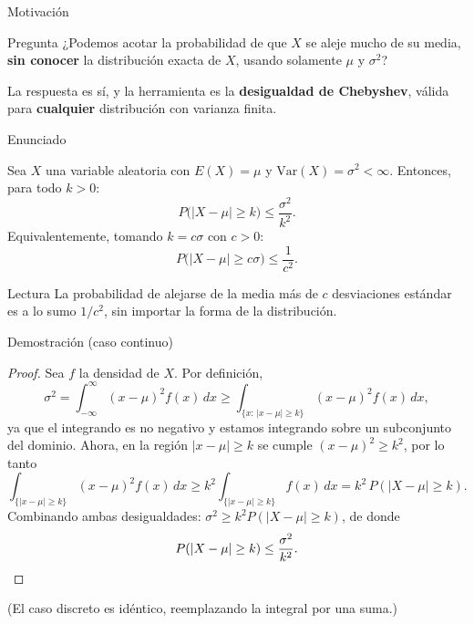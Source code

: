 \documentclass[aspectratio=169,11pt]{beamer}
\begin{document}
\begin{frame}{Motivación}
\begin{block}{Pregunta}
¿Podemos acotar la probabilidad de que $X$ se aleje mucho de su media, \textbf{sin conocer} la distribución exacta de $X$, usando solamente $\mu$ y $\sigma^2$?
\end{block}

La respuesta es sí, y la herramienta es la \textbf{desigualdad de Chebyshev}, válida para \textbf{cualquier} distribución con varianza finita.
\end{frame}

\begin{frame}{Enunciado}
\begin{theorem}
Sea $X$ una variable aleatoria con $E(X) = \mu$ y $\text{Var}(X) = \sigma^2 < \infty$. Entonces, para todo $k > 0$:
\[
P\big(|X - \mu| \geq k\big) \leq \frac{\sigma^2}{k^2}.
\]
Equivalentemente, tomando $k = c\sigma$ con $c>0$:
\[
P\big(|X-\mu| \geq c\sigma\big) \leq \frac{1}{c^2}.
\]
\end{theorem}

\begin{block}{Lectura}
La probabilidad de alejarse de la media más de $c$ desviaciones estándar es a lo sumo $1/c^2$, sin importar la forma de la distribución.
\end{block}
\end{frame}

\begin{frame}{Demostración (caso continuo)}
\begin{proof}
Sea $f$ la densidad de $X$. Por definición,
\[
\sigma^2 = \int_{-\infty}^{\infty} (x-\mu)^2 f(x)\, dx \geq \int_{\{x:\, |x-\mu|\geq k\}} (x-\mu)^2 f(x)\, dx,
\]
ya que el integrando es no negativo y estamos integrando sobre un subconjunto del dominio. Ahora, en la región $|x-\mu|\geq k$ se cumple $(x-\mu)^2 \geq k^2$, por lo tanto
\[
\int_{\{|x-\mu|\geq k\}} (x-\mu)^2 f(x)\, dx \geq k^2 \int_{\{|x-\mu|\geq k\}} f(x)\, dx = k^2\, P(|X-\mu|\geq k).
\]
Combinando ambas desigualdades: $\sigma^2 \geq k^2 P(|X-\mu|\geq k)$, de donde
\[
P(|X-\mu| \geq k) \leq \frac{\sigma^2}{k^2}. \qedhere
\]
\end{proof}
(El caso discreto es idéntico, reemplazando la integral por una suma.)
\end{frame}
\end{document}

